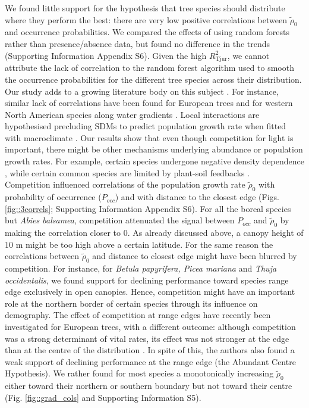 We found little support for the hypothesis that tree species should distribute where they perform the best: there are very low positive correlations between $ \tilde \rho_0 $ and occurrence probabilities. We compared the effects of using random forests rather than presence/absence data, but found no difference in the trends (Supporting Information Appendix S6). Given the high $ R_{\text{Tjur}}^{2} $, we cannot attribute the lack of correlation to the random forest algorithm used to smooth the occurrence probabilities for the different tree species across their distribution. Our study adds to a growing literature body on this subject \citep[and references therein]{Holt2020}. For instance, similar lack of correlations have been found for European trees \citep[using matrix projection models]{Csergo2017} and for western North American species along water gradients \citep{Bohner2019}. Local interactions are hypothesised precluding SDMs to predict population growth rate when fitted with macroclimate \citep{Csergo2017}. Our results show that even though competition for light is important, there might be other mechanisms underlying abundance or population growth rates. For example, certain species undergone negative density dependence \citep[for rare species]{Yenni2012}, while certain common species are limited by plant-soil feedbacks \citep[\textit{Acer saccharum}]{Solarik2019}. \\

Competition influenced correlations of the population growth rate $ \tilde \rho_0 $ with probability of occurrence ($ P_{occ} $) and with distance to the closest edge (Figs. \ref{fig::3correls}; Supporting Information Appendix S6). For all the boreal species but \textit{Abies balsamea}, competition attenuated the signal between $ P_{occ} $ and $ \tilde \rho_0 $ by making the correlation closer to 0. As already discussed above, a canopy height of $ 10 $ m might be too high above a certain latitude. For the same reason the correlations between $ \tilde \rho_0 $ and distance to closest edge might have been blurred by competition. For instance, for \textit{Betula papyrifera, Picea mariana} and \textit{Thuja occidentalis}, we found support for declining performance toward species range edge exclusively in open canopies. Hence, competition might have an important role at the northern border of certain species through its influence on demography. The effect of competition at range edges have recently been investigated for European trees, with a different outcome: although competition was a strong determinant of vital rates, its effect was not stronger at the edge than at the centre of the distribution \citep{Kunstler2019}. In spite of this, the authors also found a weak support of declining performance at the range edge (the Abundant Centre Hypothesis). We rather found for most species a monotonically increasing $ \tilde \rho_0 $ either toward their northern or southern boundary but not toward their centre (Fig. \ref{fig::grad_cols} and Supporting Information S5).



